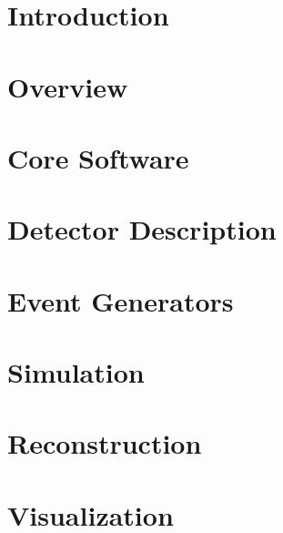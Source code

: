 \documentclass{article}[11pt]
\begin{document}
%


\newpage

\tableofcontents
\newpage

\setcounter{page}{1}


\section{Introduction}


\section{Overview}


\section{Core Software}


\section{Detector Description}


\section{Event Generators}


\section{Simulation}


\section{Reconstruction}


\section{Visualization}

\end{document}

